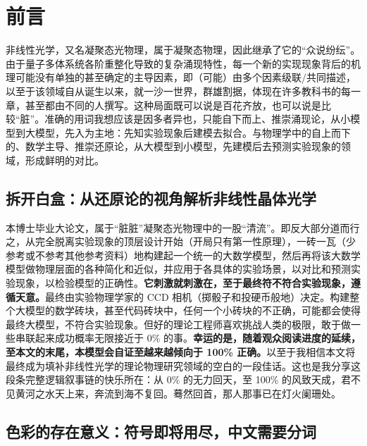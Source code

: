 

\chapter{前言}\label{chap:tttttt}

非线性光学，又名凝聚态光物理，属于凝聚态物理，因此继承了它的“众说纷纭”。由于量子多体系统各阶重整化导致的复杂涌现特性，每一个新的实现现象背后的机理可能没有单独的甚至确定的主导因素，即（可能）由多个因素级联/共同描述，以至于该领域自从诞生以来，就一沙一世界，群雄割据，体现在许多教科书的每一章，甚至都由不同的人撰写。这种局面既可以说是百花齐放，也可以说是比较“脏”。准确的用词我想应该是因多者异也，只能自下而上、推崇涌现论，从小模型到大模型，先入为主地：先知实验现象后建模去拟合。与物理学中的自上而下的、数学主导、推崇还原论，从大模型到小模型，先建模后去预测实验现象的领域，形成鲜明的对比。

\section{拆开白盒：从还原论的视角解析非线性晶体光学}\label{sec:ttt}

本博士毕业大论文，属于“脏脏”凝聚态光物理中的一股“清流”。即反大部分道而行之，从完全脱离实验现象的顶层设计开始（开局只有第一性原理），一砖一瓦（少参考或不参考其他参考资料）地构建起一个统一的大数学模型，然后再将该大数学模型做物理层面的各种简化和近似，并应用于各具体的实验场景，以对比和预测实验现象，以检验模型的正确性。\textbf{它刺激就刺激在，至于最终符不符合实验现象，遵循天意。}最终由实验物理学家的 CCD 相机（掷骰子和投硬币般地）决定。构建整个大模型的数学砖块，甚至代码砖块中，任何一个小砖块的不正确，可能都会使得最终大模型，不符合实验现象。但好的理论工程师喜欢挑战人类的极限，敢于做一些串联起来成功概率无限接近于 0\% 的事。\textbf{幸运的是，随着观众阅读进度的延续，至本文的末尾，本模型会自证至越来越倾向于 100\% 正确。}以至于我相信本文将最终成为填补非线性光学的理论物理研究领域的空白的一段佳话。这也是我分享这段条完整逻辑叙事链的快乐所在：从 0\% 的无力回天，至 100\% 的风致天成，君不见黄河之水天上来，奔流到海不复回。蓦然回首，那人那事已在灯火阑珊处。

\section{色彩的存在意义：符号即将用尽，中文需要分词}\label{sec:tt}

